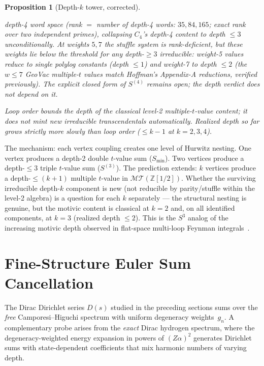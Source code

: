 \documentclass[11pt]{article}
\newtheorem{proposition}{Proposition}
\newcommand{\MT}{\mathcal{MT}}
\newcommand{\Z}{\mathbb{Z}}
\begin{document}
\begin{proposition}[Depth-$k$ tower, corrected]
\begin{itemize}
      depth-4 word space (rank $=$ number of depth-4 words: $35, 84, 165$;
      exact rank over two independent primes), collapsing $C_4$'s depth-4
      content to depth $\le 3$ unconditionally. At weights $5, 7$ the
      stuffle system is rank-deficient, but these weights lie below the
      threshold for any depth-$\ge 3$ irreducible: weight-5 values reduce
      to single polylog constants (depth $\le 1$) and weight-7 to depth
      $\le 2$ (the $w \le 7$ GeoVac multiple-$t$ values match Hoffman's
      Appendix-A reductions, verified previously). The explicit closed
      form of $S^{(4)}$ remains open; the depth verdict does not depend on
      it.
\end{itemize}
Loop order bounds the depth of the classical level-2 multiple-$t$-value
content; it does not mint new irreducible transcendentals automatically.
Realized depth so far grows strictly more slowly than loop order
($\le k-1$ at $k = 2, 3, 4$).
\end{proposition}

The mechanism: each vertex coupling creates one level of Hurwitz nesting.
One vertex produces a depth-2 double $t$-value sum ($S_{\min}$).
Two vertices produce a depth-$\le 3$ triple $t$-value sum ($S^{(3)}$).
The prediction extends: $k$ vertices produce a depth-$\le (k+1)$
multiple $t$-value in $\MT(\Z[1/2])$.  Whether the surviving
irreducible depth-$k$ component is new (not reducible by parity/stuffle
within the level-2 algebra) is a question for each $k$ separately --- the
structural nesting is genuine, but the motivic content is classical at
$k = 2$ and, on all identified components, at $k = 3$ (realized depth
$\le 2$).  This is the $S^3$ analog of the increasing motivic depth
observed in flat-space multi-loop Feynman
integrals~\cite{laporta2002,bailey2001}.

\section{Fine-Structure Euler Sum Cancellation}
\label{sec:euler_cancel}

The Dirac Dirichlet series $D(s)$ studied in the preceding sections
sums over the \emph{free} Camporesi--Higuchi spectrum with uniform
degeneracy weights~$g_n$.  A complementary probe arises from the
\emph{exact} Dirac hydrogen spectrum, where the degeneracy-weighted
energy expansion in powers of $(Z\alpha)^2$ generates Dirichlet sums
with state-dependent coefficients that mix harmonic numbers of varying
depth.
\end{document}
